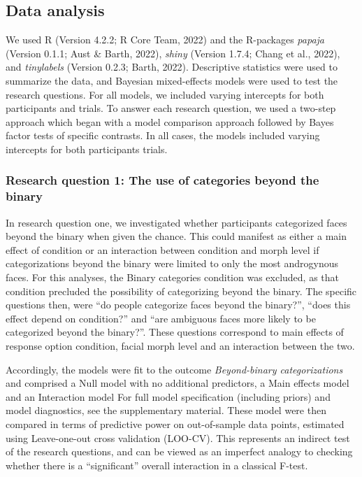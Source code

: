\documentclass[
  man]{apa7}
\begin{document}
\hypertarget{data-analysis}{%
\subsection{Data analysis}\label{data-analysis}}

We used R (Version 4.2.2; R Core Team, 2022) and the R-packages \emph{papaja} (Version 0.1.1; Aust \& Barth, 2022), \emph{shiny} (Version 1.7.4; Chang et al., 2022), and \emph{tinylabels} (Version 0.2.3; Barth, 2022). Descriptive statistics were used to summarize the data, and Bayesian mixed-effects models were used to test the research questions. For all models, we included varying intercepts for both participants and trials. To answer each research question, we used a two-step approach which began with a model comparison approach followed by Bayes factor tests of specific contrasts. In all cases, the models included varying intercepts for both participants trials.

\hypertarget{research-question-1-the-use-of-categories-beyond-the-binary}{%
\subsubsection{Research question 1: The use of categories beyond the binary}\label{research-question-1-the-use-of-categories-beyond-the-binary}}

In research question one, we investigated whether participants categorized faces beyond the binary when given the chance. This could manifest as either a main effect of condition or an interaction between condition and morph level if categorizations beyond the binary were limited to only the most androgynous faces. For this analyses, the Binary categories condition was excluded, as that condition precluded the possibility of categorizing beyond the binary. The specific questions then, were ``do people categorize faces beyond the binary?'', ``does this effect depend on condition?'' and ``are ambiguous faces more likely to be categorized beyond the binary?''. These questions correspond to main effects of response option condition, facial morph level and an interaction between the two.

Accordingly, the models were fit to the outcome \emph{Beyond-binary categorizations} and comprised a Null model with no additional predictors, a Main effects model and an Interaction model For full model specification (including priors) and model diagnostics, see the supplementary material. These model were then compared in terms of predictive power on out-of-sample data points, estimated using Leave-one-out cross validation (LOO-CV). This represents an indirect test of the research questions, and can be viewed as an imperfect analogy to checking whether there is a ``significant'' overall interaction in a classical F-test.
\end{document}

